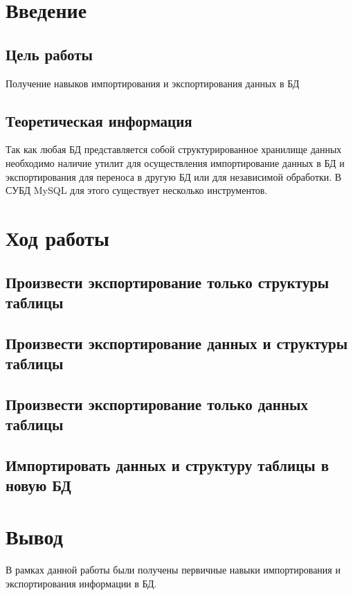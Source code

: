 \chapter{Введение}

\section{Цель работы}

Получение навыков импортирования и экспортирования данных в БД

\section{Теоретическая информация}

Так как любая БД представляется собой структурированное хранилище данных необходимо наличие утилит для осуществления импортирование данных в БД и экспортирования для переноса в другую БД или для независимой обработки. В СУБД MySQL для этого существует несколько инструментов.

\chapter{Ход работы}



\section{Произвести экспортирование только структуры таблицы}





\section{Произвести экспортирование данных и структуры таблицы}





\section{Произвести экспортирование только данных таблицы}





\section{Импортировать данных и структуру таблицы в новую БД}



\chapter{Вывод}

В рамках данной работы были получены первичные навыки импортирования и экспортирования информации в БД.